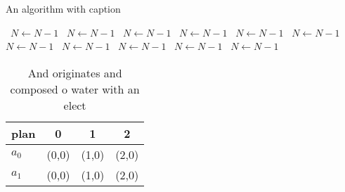 \documentclass[a4paper]{article}
\begin{document}
\begin{algorithm}
\caption{An algorithm with caption}
\begin{algorithmic}
\    \State $N \gets N - 1$
\    \State $N \gets N - 1$
\    \State $N \gets N - 1$
\    \State $N \gets N - 1$
\    \State $N \gets N - 1$
\    \State $N \gets N - 1$
\    \State $N \gets N - 1$
\    \State $N \gets N - 1$
\    \State $N \gets N - 1$
\    \State $N \gets N - 1$
\    \State $N \gets N - 1$
\EndWhile
\end{algorithmic}
\end{algorithm}

\begin{table}
\begin{adjustbox}{width=0.6\columnwidth}
\begin{tabular}{|l|l|l|l|}
\hline
\textbf{plan} & \multicolumn{1}{c|}{\textbf{0}} & \multicolumn{1}{c|}{\textbf{1}} & \multicolumn{1}{c|}{\textbf{2}} \\ \hline
\textbf{$a_0$}  & (0,0) & (1,0) & (2,0) \\ \hline
\textbf{$a_1$}  & (0,0) & (1,0) & (2,0) \\ \hline
\end{tabular}
\end{adjustbox}
\caption{And originates and composed o water with an elect
}
\end{table}
\end{document}
